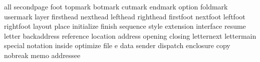\startinterface all
        {secondpage}
              {foot}
           {topmark}
           {botmark}
           {cutmark}
           {endmark}
            {option}
          {foldmark}
          {usermark}
             {layer}
         {firsthead}
          {nexthead}
          {lefthead}
         {righthead}
         {firstfoot}
          {nextfoot}
          {leftfoot}
         {rightfoot}
            {layout}
             {place}
        {initialize}
            {finish}
          {sequence}
             {style}
         {extension}
         {interface}
            {resume}
            {letter}
       {backaddress}
         {reference}
          {location}
           {address}
           {opening}
           {closing}
        {letternext}
        {lettermain}
           {special}
          {notation}
            {inside}
          {optimize}
              {file}
                 {e}
              {data}
            {sender}
          {dispatch}
         {enclosure}
              {copy}
           {nobreak}
              {memo}
         {addressee}
